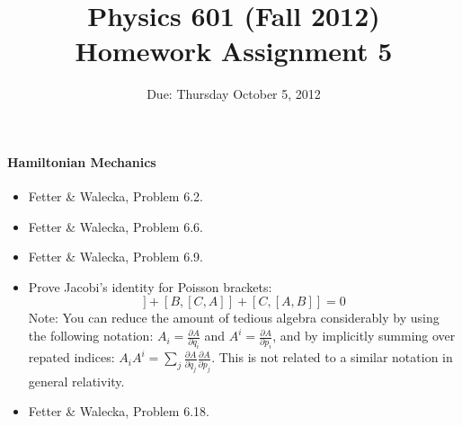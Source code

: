 \documentclass[letterpaper,11pt]{article}
\title{Physics 601 (Fall 2012) \\ Homework Assignment 5}
\date{Due: Thursday October 5, 2012}
\begin{document}
\maketitle

\paragraph*{Hamiltonian Mechanics}
\begin{itemize}
 \item Fetter \& Walecka, Problem 6.2.
 \item Fetter \& Walecka, Problem 6.6.
 \item Fetter \& Walecka, Problem 6.9.
 \item Prove Jacobi's identity for Poisson brackets:
 \begin{equation*}
  [A,[B,C]] + [B,[C,A]] + [C,[A,B]] = 0
 \end{equation*}
 Note: You can reduce the amount of tedious algebra considerably by using the following notation: $A_i = \frac{\partial A}{\partial q_i}$ and $A^i = \frac{\partial A}{\partial p_i}$, and by implicitly summing over repated indices: $A_i A^i = \sum_j \frac{\partial A}{\partial q_j} \frac{\partial A}{\partial p_j}$.  This is not related to a similar notation in general relativity.
 \item Fetter \& Walecka, Problem 6.18.
\end{itemize}
\end{document}
